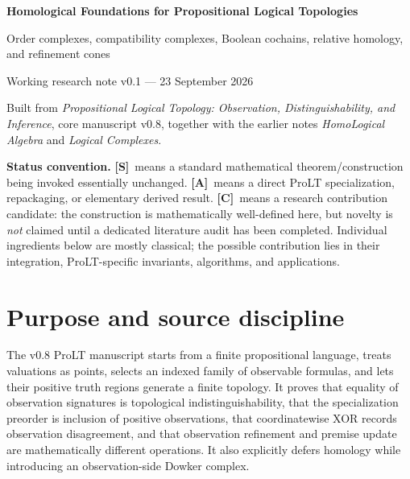\documentclass[11pt]{article}
\theoremstyle{definition}
\newcommand{\statusS}{\textbf{[S]}}
\newcommand{\statusA}{\textbf{[A]}}
\newcommand{\statusC}{\textbf{[C]}}
\begin{document}
\begin{center}
{\LARGE\bfseries\color{navy} Homological Foundations for Propositional Logical Topologies}\par
\vspace{0.35em}
{\large Order complexes, compatibility complexes, Boolean cochains, relative homology, and refinement cones}\par
\vspace{0.7em}
{\normalsize Working research note v0.1 --- 23 September 2026}\par
\vspace{0.3em}
{\small Built from \emph{Propositional Logical Topology: Observation, Distinguishability, and Inference}, core manuscript v0.8, together with the earlier notes \emph{HomoLogical Algebra} and \emph{Logical Complexes}.}
\end{center}

\vspace{0.8em}
\noindent\colorbox{softgold}{\parbox{0.96\textwidth}{
\textbf{Status convention.} \statusS\ means a standard mathematical theorem/construction being invoked essentially unchanged. \statusA\ means a direct ProLT specialization, repackaging, or elementary derived result. \statusC\ means a research contribution candidate: the construction is mathematically well-defined here, but novelty is \emph{not} claimed until a dedicated literature audit has been completed. Individual ingredients below are mostly classical; the possible contribution lies in their integration, ProLT-specific invariants, algorithms, and applications.
}}

\section{Purpose and source discipline}

The v0.8 ProLT manuscript starts from a finite propositional language, treats valuations as points, selects an indexed family of observable formulas, and lets their positive truth regions generate a finite topology. It proves that equality of observation signatures is topological indistinguishability, that the specialization preorder is inclusion of positive observations, that coordinatewise XOR records observation disagreement, and that observation refinement and premise update are mathematically different operations. It also explicitly defers homology while introducing an observation-side Dowker complex.
\end{document}
